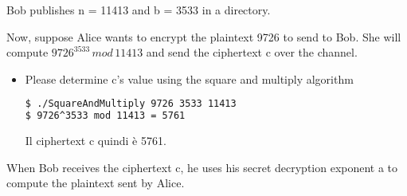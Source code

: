 \documentclass{article}
\begin{document}
Bob publishes n = 11413 and b = 3533 in a directory.

Now, suppose Alice wants to encrypt the plaintext 9726 to send to Bob. She will compute \(9726^{3533}\,  mod  \, 11413 \) and send the ciphertext c over the channel.

\begin{itemize}
    \item Please determine c’s value using the square and multiply algorithm
    \begin{lstlisting}[language=bash]
$ ./SquareAndMultiply 9726 3533 11413
$ 9726^3533 mod 11413 = 5761
    \end{lstlisting}
    Il ciphertext c quindi \`{e} 5761.
\end{itemize}

When Bob receives the ciphertext c, he uses his secret decryption exponent a to compute the plaintext sent by Alice.
\end{document}
